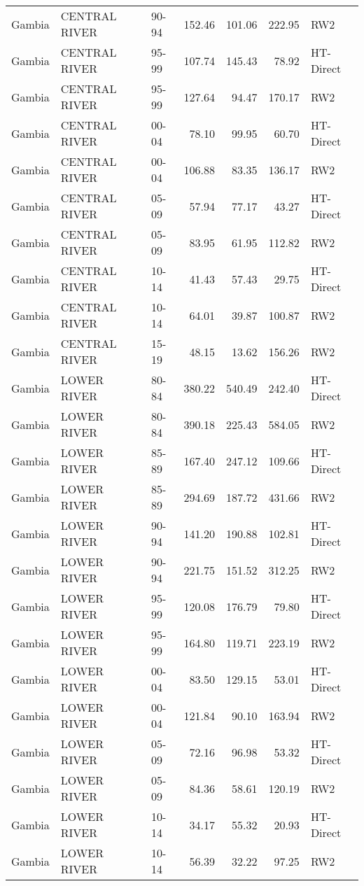 \begin{longtable}{lllrrrl}
  Gambia & CENTRAL RIVER & 90-94 & 152.46 & 101.06 & 222.95 & RW2 \\ 
  Gambia & CENTRAL RIVER & 95-99 & 107.74 & 145.43 & 78.92 & HT-Direct \\ 
  Gambia & CENTRAL RIVER & 95-99 & 127.64 & 94.47 & 170.17 & RW2 \\ 
  Gambia & CENTRAL RIVER & 00-04 & 78.10 & 99.95 & 60.70 & HT-Direct \\ 
  Gambia & CENTRAL RIVER & 00-04 & 106.88 & 83.35 & 136.17 & RW2 \\ 
  Gambia & CENTRAL RIVER & 05-09 & 57.94 & 77.17 & 43.27 & HT-Direct \\ 
  Gambia & CENTRAL RIVER & 05-09 & 83.95 & 61.95 & 112.82 & RW2 \\ 
  Gambia & CENTRAL RIVER & 10-14 & 41.43 & 57.43 & 29.75 & HT-Direct \\ 
  Gambia & CENTRAL RIVER & 10-14 & 64.01 & 39.87 & 100.87 & RW2 \\ 
  Gambia & CENTRAL RIVER & 15-19 & 48.15 & 13.62 & 156.26 & RW2 \\ 
  Gambia & LOWER RIVER & 80-84 & 380.22 & 540.49 & 242.40 & HT-Direct \\ 
  Gambia & LOWER RIVER & 80-84 & 390.18 & 225.43 & 584.05 & RW2 \\ 
  Gambia & LOWER RIVER & 85-89 & 167.40 & 247.12 & 109.66 & HT-Direct \\ 
  Gambia & LOWER RIVER & 85-89 & 294.69 & 187.72 & 431.66 & RW2 \\ 
  Gambia & LOWER RIVER & 90-94 & 141.20 & 190.88 & 102.81 & HT-Direct \\ 
  Gambia & LOWER RIVER & 90-94 & 221.75 & 151.52 & 312.25 & RW2 \\ 
  Gambia & LOWER RIVER & 95-99 & 120.08 & 176.79 & 79.80 & HT-Direct \\ 
  Gambia & LOWER RIVER & 95-99 & 164.80 & 119.71 & 223.19 & RW2 \\ 
  Gambia & LOWER RIVER & 00-04 & 83.50 & 129.15 & 53.01 & HT-Direct \\ 
  Gambia & LOWER RIVER & 00-04 & 121.84 & 90.10 & 163.94 & RW2 \\ 
  Gambia & LOWER RIVER & 05-09 & 72.16 & 96.98 & 53.32 & HT-Direct \\ 
  Gambia & LOWER RIVER & 05-09 & 84.36 & 58.61 & 120.19 & RW2 \\ 
  Gambia & LOWER RIVER & 10-14 & 34.17 & 55.32 & 20.93 & HT-Direct \\ 
  Gambia & LOWER RIVER & 10-14 & 56.39 & 32.22 & 97.25 & RW2 \\ 

\end{longtable}

